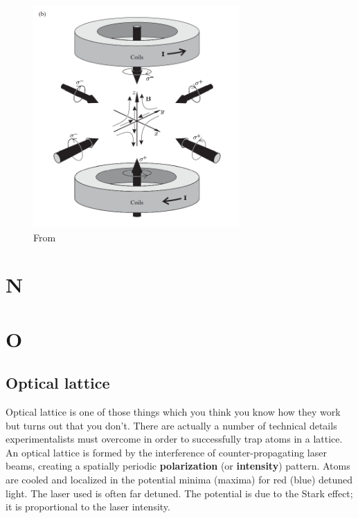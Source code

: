 \documentclass{book}
\theoremstyle{definition}
\begin{document}
\begin{figure}[!htb]
	\centering
	\includegraphics[width=0.7\textwidth]{images/foot_2}
	\caption{From \cite{foot2005atomic}}
\end{figure}


\chapter*{N}
\chapter*{O}



\section*{Optical lattice}



Optical lattice is one of those things which you think you know how they work but turns out that you don't. There are actually a number of technical details experimentalists must overcome in order to successfully trap atoms in a lattice. \\




An optical lattice is formed by the interference of counter-propagating laser beams, creating a spatially periodic \textbf{polarization} (or \textbf{intensity}) pattern. Atoms are cooled and localized in the potential minima (maxima) for red (blue) detuned light. The laser used is often far detuned.  The potential is due to the Stark effect; it is proportional to the laser intensity. \\
\end{document}
